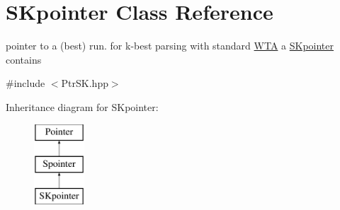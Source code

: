 \hypertarget{classSKpointer}{}\section{S\+Kpointer Class Reference}
\label{classSKpointer}


pointer to a (best) run. for k-\/best parsing with standard \mbox{\hyperlink{classWTA}{W\+TA}} a \mbox{\hyperlink{classSKpointer}{S\+Kpointer}} contains  




{\ttfamily \#include $<$Ptr\+S\+K.\+hpp$>$}

Inheritance diagram for S\+Kpointer\+:\begin{figure}[H]
\begin{center}
\leavevmode
\includegraphics[height=3.000000cm]{classSKpointer}
\end{center}
\end{figure}
